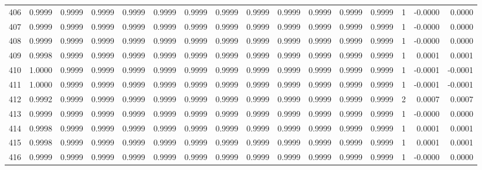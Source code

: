 \begin{tabular}{lrrrrrrrrrrrrrrr}
406 &      0.9999 &  0.9999 &  0.9999 &  0.9999 &  0.9999 &  0.9999 &  0.9999 &  0.9999 &  0.9999 &  0.9999 &   0.9999 &     0.9999 &      1 &                   -0.0000 &                     0.0000 \\
407 &      0.9999 &  0.9999 &  0.9999 &  0.9999 &  0.9999 &  0.9999 &  0.9999 &  0.9999 &  0.9999 &  0.9999 &   0.9999 &     0.9999 &      1 &                   -0.0000 &                     0.0000 \\
408 &      0.9999 &  0.9999 &  0.9999 &  0.9999 &  0.9999 &  0.9999 &  0.9999 &  0.9999 &  0.9999 &  0.9999 &   0.9999 &     0.9999 &      1 &                   -0.0000 &                     0.0000 \\
409 &      0.9998 &  0.9999 &  0.9999 &  0.9999 &  0.9999 &  0.9999 &  0.9999 &  0.9999 &  0.9999 &  0.9999 &   0.9999 &     0.9999 &      1 &                    0.0001 &                     0.0001 \\
410 &      1.0000 &  0.9999 &  0.9999 &  0.9999 &  0.9999 &  0.9999 &  0.9999 &  0.9999 &  0.9999 &  0.9999 &   0.9999 &     0.9999 &      1 &                   -0.0001 &                    -0.0001 \\
411 &      1.0000 &  0.9999 &  0.9999 &  0.9999 &  0.9999 &  0.9999 &  0.9999 &  0.9999 &  0.9999 &  0.9999 &   0.9999 &     0.9999 &      1 &                   -0.0001 &                    -0.0001 \\
412 &      0.9992 &  0.9999 &  0.9999 &  0.9999 &  0.9999 &  0.9999 &  0.9999 &  0.9999 &  0.9999 &  0.9999 &   0.9999 &     0.9999 &      2 &                    0.0007 &                     0.0007 \\
413 &      0.9999 &  0.9999 &  0.9999 &  0.9999 &  0.9999 &  0.9999 &  0.9999 &  0.9999 &  0.9999 &  0.9999 &   0.9999 &     0.9999 &      1 &                   -0.0000 &                     0.0000 \\
414 &      0.9998 &  0.9999 &  0.9999 &  0.9999 &  0.9999 &  0.9999 &  0.9999 &  0.9999 &  0.9999 &  0.9999 &   0.9999 &     0.9999 &      1 &                    0.0001 &                     0.0001 \\
415 &      0.9998 &  0.9999 &  0.9999 &  0.9999 &  0.9999 &  0.9999 &  0.9999 &  0.9999 &  0.9999 &  0.9999 &   0.9999 &     0.9999 &      1 &                    0.0001 &                     0.0001 \\
416 &      0.9999 &  0.9999 &  0.9999 &  0.9999 &  0.9999 &  0.9999 &  0.9999 &  0.9999 &  0.9999 &  0.9999 &   0.9999 &     0.9999 &      1 &                   -0.0000 &                     0.0000 \\

\end{tabular}

